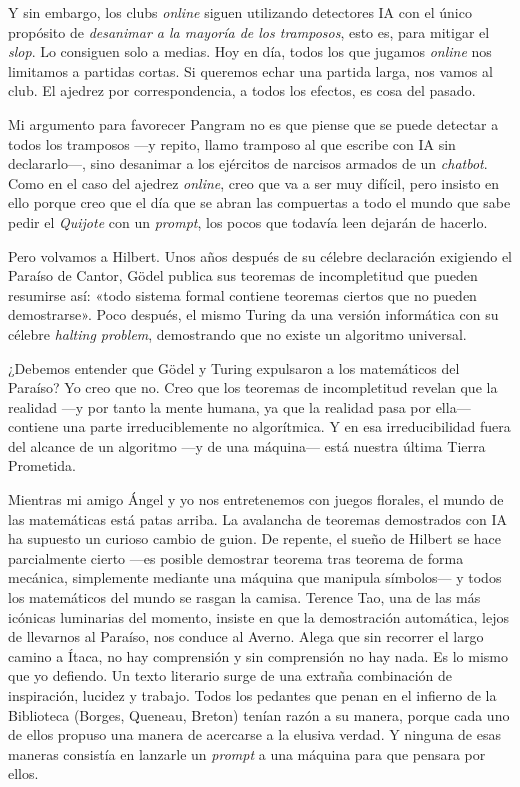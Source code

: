 \documentclass[11pt,a4paper]{article}
\begin{document}
Y sin embargo, los clubs \emph{online} siguen utilizando detectores IA con el único propósito de \emph{desanimar a la mayoría de los tramposos}, esto es, para mitigar el \emph{slop}. Lo consiguen solo a medias. Hoy en día, todos los que jugamos \emph{online} nos limitamos a partidas cortas. Si queremos echar una partida larga, nos vamos al club. El ajedrez por correspondencia, a todos los efectos, es cosa del pasado.

Mi argumento para favorecer Pangram no es que piense que se puede detectar a todos los tramposos ---y repito, llamo tramposo al que escribe con IA sin declararlo---, sino desanimar a los ejércitos de narcisos armados de un \emph{chatbot}. Como en el caso del ajedrez \emph{online}, creo que va a ser muy difícil, pero insisto en ello porque creo que el día que se abran las compuertas a todo el mundo que sabe pedir el \emph{Quijote} con un \emph{prompt}, los pocos que todavía leen dejarán de hacerlo.

Pero volvamos a Hilbert. Unos años después de su célebre declaración exigiendo el Paraíso de Cantor, Gödel publica sus teoremas de incompletitud que pueden resumirse así: «todo sistema formal contiene teoremas ciertos que no pueden demostrarse». Poco después, el mismo Turing da una versión informática con su célebre \emph{halting problem}, demostrando que no existe un algoritmo universal.

¿Debemos entender que Gödel y Turing expulsaron a los matemáticos del Paraíso? Yo creo que no. Creo que los teoremas de incompletitud revelan que la realidad ---y por tanto la mente humana, ya que la realidad pasa por ella--- contiene una parte irreduciblemente no algorítmica. Y en esa irreducibilidad fuera del alcance de un algoritmo ---y de una máquina--- está nuestra última Tierra Prometida.

Mientras mi amigo Ángel y yo nos entretenemos con juegos florales, el mundo de las matemáticas está patas arriba. La avalancha de teoremas demostrados con IA ha supuesto un curioso cambio de guion. De repente, el sueño de Hilbert se hace parcialmente cierto ---es posible demostrar teorema tras teorema de forma mecánica, simplemente mediante una máquina que manipula símbolos--- y todos los matemáticos del mundo se rasgan la camisa. Terence Tao, una de las más icónicas luminarias del momento, insiste en que la demostración automática, lejos de llevarnos al Paraíso, nos conduce al Averno. Alega que sin recorrer el largo camino a Ítaca, no hay comprensión y sin comprensión no hay nada. Es lo mismo que yo defiendo. Un texto literario surge de una extraña combinación de inspiración, lucidez y trabajo. Todos los pedantes que penan en el infierno de la Biblioteca (Borges, Queneau, Breton) tenían razón a su manera, porque cada uno de ellos propuso una manera de acercarse a la elusiva verdad. Y ninguna de esas maneras consistía en lanzarle un \emph{prompt} a una máquina para que pensara por ellos.
\end{document}
